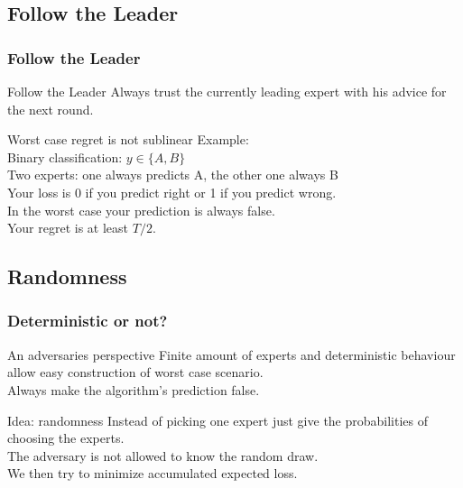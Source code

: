 \documentclass{beamer}
\begin{document}
\subsection{Follow the Leader}
\begin{frame}
	\frametitle{Follow the Leader}
	
	\begin{block}{Follow the Leader}
		Always trust the currently leading expert with his advice for the next round. 
	\end{block}
	
	\pause
	
	\begin{block}{Worst case regret is not sublinear}
		Example:\\
		Binary classification: $y \in \{A, B\}$\\
		Two experts: one always predicts A, the other one always B\\
		Your loss is 0 if you predict right or 1 if you predict wrong.\\ \pause
		\vspace{1em}
		In the worst case your prediction is always false.\\
		Your regret is at least $T/2$.
	\end{block}	
\end{frame}

\subsection{Randomness}
\begin{frame}
	\frametitle{Deterministic or not?}
	
	\begin{block}{An adversaries perspective}
		Finite amount of experts and deterministic behaviour allow easy construction of worst case scenario.\\
		Always make the algorithm's prediction false.
	\end{block}	
	 \pause
	\begin{block}{Idea: randomness}
		Instead of picking one expert just give the probabilities of choosing the experts.\\
		The adversary is not allowed to know the random draw.\\
		We then try to minimize accumulated expected loss.
	\end{block}	
\end{frame}
\end{document}
